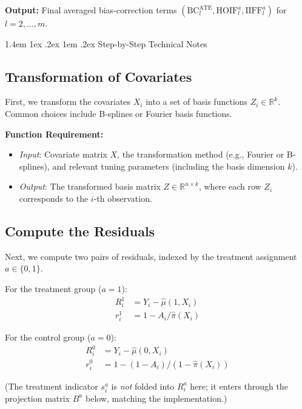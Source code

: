 \documentclass[12pt]{article}
\makeatletter
\renewcommand{\section}{\@startsection{section}{1}{\z@}%
  {1.4em \@plus 1ex \@minus .2ex}%
  {1em \@plus .2ex}%
  {\normalfont\Large\bfseries}}
\makeatother
\begin{document}
\textbf{Output:} Final averaged bias-correction terms $(\mathrm{BC}^{\mathrm{ATE}}_l, \text{HOIF}_l^a, \text{IIFF}_l^a)$ for $l = 2, \ldots, m$.

\section{Step-by-Step Technical Notes}

\subsection{Transformation of Covariates}

First, we transform the covariates $X_i$ into a set of basis functions $Z_i \in \mathbb{R}^k$. Common choices include B-splines or Fourier basis functions.

\textbf{Function Requirement:}
\begin{itemize}
  \item \textit{Input}: Covariate matrix $X$, the transformation method (e.g., Fourier or B-splines), and relevant tuning parameters (including the basis dimension $k$).
  \item \textit{Output}: The transformed basis matrix $Z \in \mathbb{R}^{n \times k}$, where each row $Z_i$ corresponds to the $i$-th observation.
\end{itemize}

\subsection{Compute the Residuals}

Next, we compute two pairs of residuals, indexed by the treatment assignment $a \in \{0,1\}$.

For the treatment group ($a = 1$):
\begin{align*}
  R_i^1 &= Y_i - \hat{\mu}(1,X_i) \\
  r_i^1 &= 1 - A_i / \hat{\pi}(X_i)
\end{align*}

For the control group ($a = 0$):
\begin{align*}
  R_i^0 &= Y_i - \hat{\mu}(0,X_i) \\
  r_i^0 &= 1 - (1 - A_i) / (1 - \hat{\pi}(X_i))
\end{align*}

(The treatment indicator $s^a_i$ is \emph{not} folded into $R^a_i$ here; it enters through the projection matrix $B^a$ below, matching the implementation.)
\end{document}
